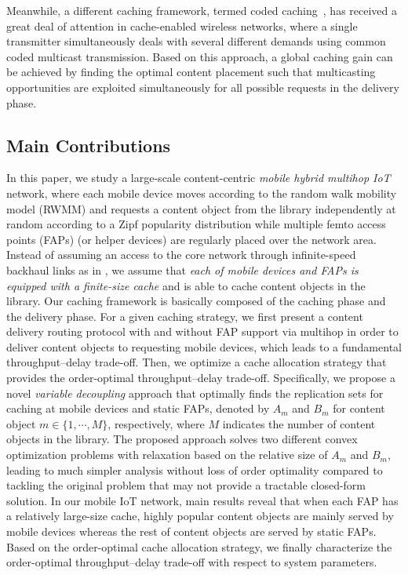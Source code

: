\documentclass[10pt,journal,compsoc,onecolumn]{IEEEtran}
\begin{document}
Meanwhile, a different caching framework, termed coded
caching~\cite{Nie,Nie1,Nie3}, has received a great deal of
attention in cache-enabled wireless networks, where a single
transmitter simultaneously deals with several different demands
using common coded multicast transmission. Based on this approach,
a global caching gain can be achieved by finding the optimal
content placement such that multicasting opportunities are
exploited simultaneously for all possible requests in the delivery
phase.

\subsection{Main Contributions}
In this paper, we study a large-scale content-centric {\em mobile hybrid multihop IoT} network, where each mobile device moves according to the random walk mobility model (RWMM) and requests a content object from
the library independently at random according to a Zipf popularity
distribution while multiple femto access points (FAPs) (or helper devices) are
regularly placed over the network area. 
Instead of assuming an access to the core network through
infinite-speed backhaul links as in \cite{a1},
we assume that \textit{each of mobile devices and FAPs is equipped
with a finite-size cache} and is able to cache content objects in
the library. Our caching
framework is basically composed of the caching phase and the
delivery phase. For a given caching strategy, we first present a
content delivery routing protocol with and without FAP support via
multihop in order to deliver content objects to requesting mobile devices,
which leads to a fundamental throughput--delay trade-off. Then, we
optimize a cache allocation strategy that provides the
order-optimal throughput--delay trade-off. Specifically, we propose a novel \textit{variable
decoupling} approach that optimally finds the replication sets for
caching at mobile devices and static FAPs, denoted by $A_m$ and $B_m$ for
content object $m\in\{1,\cdots,M\}$, respectively, where $M$
indicates the number of content objects in the library. 
The proposed approach solves two different convex optimization problems with relaxation based on the relative size of $A_m$ and $B_m$, leading to much simpler analysis without loss of order optimality compared to tackling the original problem that may not provide a tractable closed-form
solution. In our mobile IoT network, main results reveal that when each FAP has a
relatively large-size cache, highly popular content objects are
mainly served by mobile devices whereas the rest of content objects
are served by static FAPs. Based on the order-optimal cache
allocation strategy, we finally characterize the order-optimal
throughput--delay trade-off with respect to system parameters.
\end{document}
